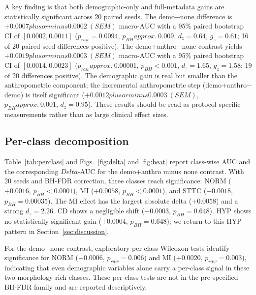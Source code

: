 \documentclass[mathematics,article,submit,pdftex]{Definitions/mdpi}
\def\texttt#1{#1}%
\def\mathrm#1{#1}%
\def\textbf#1{#1}%
\def\Delta{Delta }%
\def\pm{plus or minus }%
\def\approx{approx.\ }%
\begin{document}
A key finding is that \textbf{both demographic-only and full-metadata gains are statistically significant} across 20 paired seeds. The \texttt{demo}$-$\texttt{none} difference is $+0.0007 \pm 0.0002\ (\mathrm{SEM})$ macro-AUC with a 95\% paired bootstrap CI of $[0.0002, 0.0011]$ ($p_{\mathrm{raw}}{=}0.0094$, $p_{\mathrm{BH}}{\approx}0.009$, $d_{\mathrm{z}}{=}0.64$, $g_{\mathrm{z}}{=}0.61$; 16 of 20 paired seed differences positive). The \texttt{demo+anthro}$-$\texttt{none} contrast yields $+0.0019 \pm 0.0003\ (\mathrm{SEM})$ macro-AUC with a 95\% paired bootstrap CI of $[0.0014, 0.0023]$ ($p_{\mathrm{raw}}{\approx}0.00001$, $p_{\mathrm{BH}}{<}0.001$, $d_{\mathrm{z}}{=}1.65$, $g_{\mathrm{z}}{=}1.58$; 19 of 20 differences positive). The demographic gain is real but smaller than the anthropometric component; the incremental anthropometric step (\texttt{demo+anthro}$-$\texttt{demo}) is itself significant ($+0.0012 \pm 0.0003\ (\mathrm{SEM})$, $p_{\mathrm{BH}}{\approx}0.001$, $d_{\mathrm{z}}{=}0.95$). These results should be read as protocol-specific measurements rather than as large clinical effect sizes.

\subsection{Per-class decomposition}
Table~\ref{tab:perclass} and Figs.~\ref{fig:delta} and \ref{fig:heat} report class-wise AUC and the corresponding $\Delta$-AUC for the \texttt{demo+anthro} minus \texttt{none} contrast. With 20 seeds and BH-FDR correction, \textbf{three classes reach significance}: \textbf{NORM} ($+0.0016$, $p_{\mathrm{BH}}{<}0.0001$), \textbf{MI} ($+0.0058$, $p_{\mathrm{BH}}{<}0.0001$), and \textbf{STTC} ($+0.0018$, $p_{\mathrm{BH}}{=}0.00035$). The MI effect has the largest absolute delta ($+0.0058$) and a strong $d_{\mathrm{z}}{=}2.26$. CD shows a negligible shift ($-0.0003$, $p_{\mathrm{BH}}{=}0.648$). \textbf{HYP shows no statistically significant gain} ($+0.0004$, $p_{\mathrm{BH}}{=}0.648$); we return to this HYP pattern in Section~\ref{sec:discussion}.

For the \texttt{demo}$-$\texttt{none} contrast, exploratory per-class Wilcoxon tests identify significance for NORM ($+0.0006$, $p_{\mathrm{raw}}{=}0.006$) and MI ($+0.0020$, $p_{\mathrm{raw}}{=}0.003$), indicating that even demographic variables alone carry a per-class signal in these two morphology-rich classes. These per-class tests are not in the pre-specified BH-FDR family and are reported descriptively.
\end{document}
